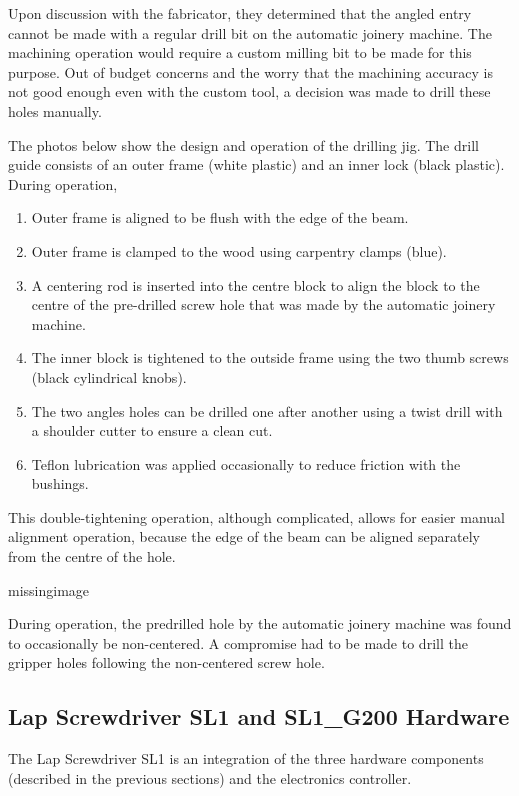 Upon discussion with the fabricator, they determined that the angled entry cannot be made with a regular drill bit on the automatic joinery machine. The machining operation would require a custom milling bit to be made for this purpose. Out of budget concerns and the worry that the machining accuracy is not good enough even with the custom tool, a decision was made to drill these holes manually.

The photos below show the design and operation of the drilling jig. The drill guide consists of an outer frame (white plastic) and an inner lock (black plastic). During operation, 

\begin{enumerate}
    \item Outer frame is aligned to be flush with the edge of the beam.
    \item Outer frame is clamped to the wood using carpentry clamps (blue).
    \item A centering rod is inserted into the centre block to align the block to the centre of the pre-drilled screw hole that was made by the automatic joinery machine.
    \item The inner block is tightened to the outside frame using the two thumb screws (black cylindrical knobs).
    \item The two angles holes can be drilled one after another using a twist drill with a shoulder cutter to ensure a clean cut.
    \item Teflon lubrication was applied occasionally to reduce friction with the bushings.
\end{enumerate}

This double-tightening operation, although complicated, allows for easier manual alignment operation, because the edge of the beam can be aligned separately from the centre of the hole.

missingimage

During operation, the predrilled hole by the automatic joinery machine was found to occasionally be non-centered. A compromise had to be made to drill the gripper holes following the non-centered screw hole.

\subsection{Lap Screwdriver SL1 and SL1\_G200 Hardware}
\label{subsection:exploration_4_lap_screwdriver_sl1_and_sl1_g200_hardware}

The Lap Screwdriver SL1 is an integration of the three hardware components (described in the previous sections) and the electronics controller.

